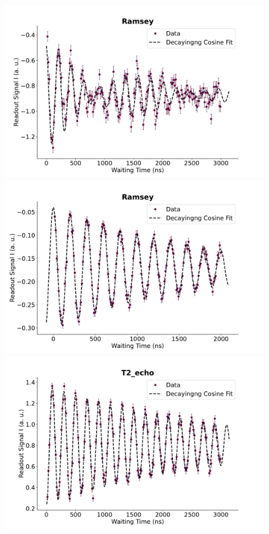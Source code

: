 \begin{figure}[t]
    \begin{minipage}{0.33\linewidth}
        \centering
        \includegraphics[width=1.0\linewidth]{Calibrations/Figures/Ramsey.pdf} %
    \end{minipage}
    \begin{minipage}{0.33\linewidth}
        \centering
        \includegraphics[width = 1.0 \linewidth]{Calibrations/Figures/old_figs/Ramsey.pdf}        
    \end{minipage}
    \begin{minipage}{0.33\linewidth}
        \centering
        \includegraphics[width=1.0\linewidth]{Calibrations/Figures/T2_echo.pdf} %
    \end{minipage}
    

\end{figure}

